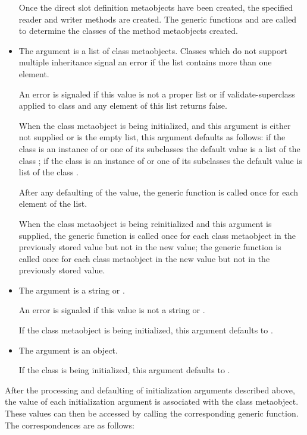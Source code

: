 \begin{itemize}
  Once the direct slot definition metaobjects have been created, the specified
  reader and writer methods are created. The generic functions
   and  are called to
  determine the classes of the method metaobjects created.

\item The  argument is a list of class metaobjects. Classes
  which do not support multiple inheritance signal an error if the list contains
  more than one element.

  An error is signaled if this value is not a proper list or if
  validate-superclass applied to class and any element of this list returns
  false.

  When the class metaobject is being initialized, and this argument is either
  not supplied or is the empty list, this argument defaults as follows: if the
  class is an instance of  or one of its subclasses the
  default value is a list of the class ; if the class is an
  instance of  or one of its subclasses the
  default value is list of the class .

  After any defaulting of the value, the generic function  is
  called once for each element of the list.

  When the class metaobject is being reinitialized and this argument is
  supplied, the generic function  is called once for
  each class metaobject in the previously stored value but not in the new value;
  the generic function  is called once for each class
  metaobject in the new value but not in the previously stored value.

\item The  argument is a string or .

  An error is signaled if this value is not a string or .

  If the class metaobject is being initialized, this argument defaults to .

\item The  argument is an object.

  If the class is being initialized, this argument defaults to .
\end{itemize}
  
After the processing and defaulting of initialization arguments described
above, the value of each initialization argument is associated with the
class metaobject. These values can then be accessed by calling the
corresponding generic function. The correspondences are as follows:

